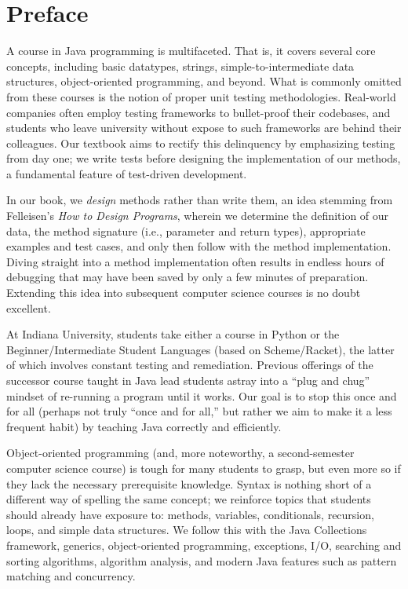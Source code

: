 \chapter*{Preface}

A course in Java programming is multifaceted. 
That is, it covers several core concepts, including basic datatypes, strings, simple-to-intermediate data structures, object-oriented programming, and beyond. 
What is commonly omitted from these courses is the notion of proper unit testing methodologies. 
Real-world companies often employ testing frameworks to bullet-proof their codebases, and students who leave university without expose to such frameworks are behind their colleagues. 
Our textbook aims to rectify this delinquency by emphasizing testing from day one; we write tests before designing the implementation of our methods, a fundamental feature of test-driven development.

In our book, we \emph{design} methods rather than write them, an idea stemming from Felleisen's \emph{How to Design Programs}, wherein we determine the definition of our data, the method signature (i.e., parameter and return types), appropriate examples and test cases, and only then follow with the method implementation. 
Diving straight into a method implementation often results in endless hours of debugging that may have been saved by only a few minutes of preparation. 
Extending this idea into subsequent computer science courses is no doubt excellent.

At Indiana University, students take either a course in Python or the Beginner/Intermediate Student Languages (based on Scheme/Racket), the latter of which involves constant testing and remediation. 
Previous offerings of the successor course taught in Java lead students astray into a ``plug and chug'' mindset of re-running a program until it works.
Our goal is to stop this once and for all (perhaps not truly ``once and for all,'' but rather we aim to make it a less frequent habit) by teaching Java correctly and efficiently. 

Object-oriented programming (and, more noteworthy, a second-semester computer science course) is tough for many students to grasp, but even more so if they lack the necessary prerequisite knowledge. 
Syntax is nothing short of a different way of spelling the same concept; we reinforce topics that students should already have exposure to: methods, variables, conditionals, recursion, loops, and simple data structures. 
We follow this with the Java Collections framework, generics, object-oriented programming, exceptions, I/O, searching and sorting algorithms, algorithm analysis, and modern Java features such as pattern matching and concurrency. 

